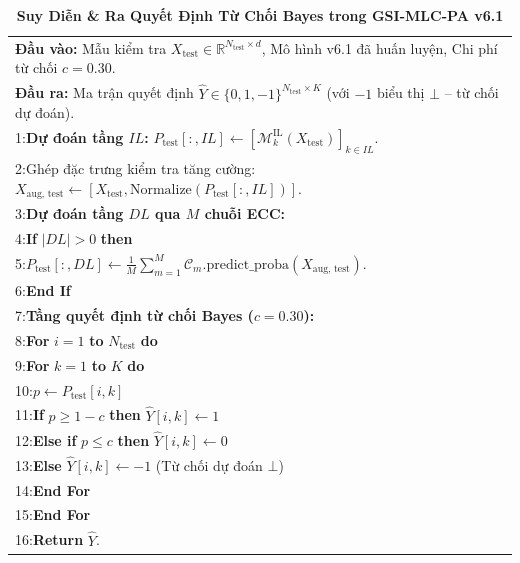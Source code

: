 \documentclass[11pt,a4paper]{article}
\begin{document}
\begin{table}[!htbp]
\centering
\small
\caption{\textbf{Suy Diễn \& Ra Quyết Định Từ Chối Bayes trong GSI-MLC-PA v6.1}}\label{alg:v61_inference}
\begin{tabular}{p{}}
\toprule
\textbf{Đầu vào:} Mẫu kiểm tra $X_{\text{test}} \in \mathbb{R}^{N_{\text{test}} \times d}$, Mô hình v6.1 đã huấn luyện, Chi phí từ chối $c = 0.30$. \\
\textbf{Đầu ra:} Ma trận quyết định $\hat{Y} \in \{0, 1, -1\}^{N_{\text{test}} \times K}$ (với $-1$ biểu thị $\bot$ -- từ chối dự đoán). \\
\midrule
1:\quad \textbf{Dự đoán tầng $IL$:} $P_{\text{test}}[:, IL] \leftarrow [\mathcal{M}_k^{\text{IL}}(X_{\text{test}})]_{k \in IL}$. \\
2:\quad Ghép đặc trưng kiểm tra tăng cường: $X_{\text{aug, test}} \leftarrow [X_{\text{test}}, \text{Normalize}(P_{\text{test}}[:, IL])]$. \\
3:\quad \textbf{Dự đoán tầng $DL$ qua $M$ chuỗi ECC:} \\
4:\quad \textbf{If} $|DL| > 0$ \textbf{then} \\
5:\quad\quad $P_{\text{test}}[:, DL] \leftarrow \frac{1}{M} \sum_{m=1}^M \mathcal{C}_m.\text{predict\_proba}(X_{\text{aug, test}})$. \\
6:\quad \textbf{End If} \\
7:\quad \textbf{Tầng quyết định từ chối Bayes ($c = 0.30$):} \\
8:\quad \textbf{For} $i = 1$ \textbf{to} $N_{\text{test}}$ \textbf{do} \\
9:\quad\quad \textbf{For} $k = 1$ \textbf{to} $K$ \textbf{do} \\
10:\quad\quad\quad $p \leftarrow P_{\text{test}}[i, k]$ \\
11:\quad\quad\quad \textbf{If} $p \ge 1 - c$ \textbf{then} $\hat{Y}[i, k] \leftarrow 1$ \\
12:\quad\quad\quad \textbf{Else if} $p \le c$ \textbf{then} $\hat{Y}[i, k] \leftarrow 0$ \\
13:\quad\quad\quad \textbf{Else} $\hat{Y}[i, k] \leftarrow -1$ \quad (Từ chối dự đoán $\bot$) \\
14:\quad\quad \textbf{End For} \\
15:\quad \textbf{End For} \\
16:\quad \textbf{Return} $\hat{Y}$. \\
\bottomrule
\end{tabular}
\end{table}
\end{document}
